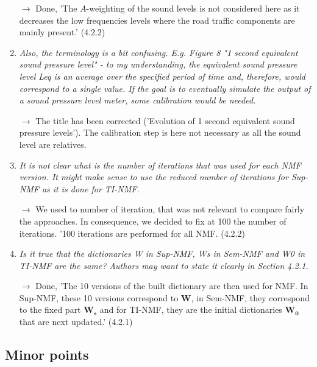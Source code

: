 \documentclass[10pt]{article}
\begin{document}
\begin{enumerate}
$\rightarrow$ Done, 'The $A$-weighting of the sound levels is not considered here as it decreases the low frequencies levels where the road traffic components are mainly present.' (4.2.2)

\item \emph{Also, the terminology is a bit confusing. E.g. Figure 8 "1 second equivalent sound pressure level" - to my understanding, the equivalent sound pressure level Leq is an average over the specified period of time and, therefore, would correspond to a single value. If the goal is to eventually simulate the output of a sound pressure level meter, some calibration would be needed.}

$\rightarrow$ The title has been corrected ('Evolution of 1 second equivalent sound pressure levels'). The calibration step is here not necessary as all the sound level are relatives.

\item \emph{It is not clear what is the number of iterations that was used for each NMF version. It might make sense to use the reduced number of iterations for Sup-NMF as it is done for TI-NMF.}

$\rightarrow$ We used to number of iteration, that was not relevant to compare fairly the approaches. In consequence, we decided to fix at 100 the number of iterations. '100 iterations are performed for all NMF. (4.2.2)

\item \emph{Is it true that the dictionaries W in Sup-NMF, Ws in Sem-NMF and W0 in TI-NMF are the same? Authors may want to state it clearly in Section 4.2.1.}

$\rightarrow$ Done, 'The 10 versions of the built dictionary are then used for NMF. In Sup-NMF, these 10 versions correspond to $\mathbf{W}$, in Sem-NMF, they correspond to the fixed part $\mathbf{W_s}$ and for TI-NMF, they are the initial dictionaries $\mathbf{W_0}$ that are next updated.' (4.2.1)

\end{enumerate}
\subsection{Minor points}
\end{document}
